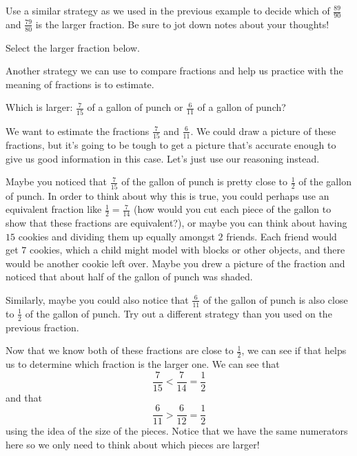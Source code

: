 \documentclass{ximera}
\begin{document}
\begin{question}
Use a similar strategy as we used in the previous example to decide which of $\frac{89}{90}$ and $\frac{79}{80}$ is the larger fraction. Be sure to jot down notes about your thoughts!

Select the larger fraction below.
\begin{multipleChoice}
\end{multipleChoice}
\end{question}


Another strategy we can use to compare fractions and help us practice with the meaning of fractions is to estimate.

\begin{question}
Which is larger: $\frac{7}{15}$ of a gallon of punch or $\frac{6}{11}$ of a gallon of punch?

\begin{explanation}

We want to estimate the fractions $\frac{7}{15}$ and $\frac{6}{11}$. We could draw a picture of these fractions, but it's going to be tough to get a picture that's accurate enough to give us good information in this case. Let's just use our reasoning instead.

Maybe you noticed that $\frac{7}{15}$ of the gallon of punch is pretty close to $\frac{1}{2}$ of the gallon of punch. In order to think about why this is true, you could perhaps use an equivalent fraction like $\frac{1}{2} = \frac{7}{14}$ (how would you cut each piece of the gallon to show that these fractions are equivalent?), or maybe you can think about having $15$ cookies and dividing them up equally amongst $2$ friends. Each friend would get $7$ cookies, which a child might model with blocks or other objects, and there would be another cookie left over. Maybe you drew a picture of the fraction and noticed that about half of the gallon of punch was shaded.

Similarly, maybe you could also notice that $\frac{6}{11}$ of the gallon of punch is also close to $\frac{1}{2}$ of the gallon of punch. Try out a different strategy than you used on the previous fraction.

Now that we know both of these fractions are close to $\frac{1}{2}$, we can see if that helps us to determine which fraction is the larger one. We can see that
\[
\frac{7}{15} < \frac{7}{14} = \frac{1}{2}
\]
and that 
\[
\frac{6}{11} > \frac{6}{12} = \frac{1}{2}
\]
using the idea of the size of the pieces. Notice that we have the same numerators here so we only need to think about which pieces are larger!


\end{explanation}
\end{question}
\end{document}
